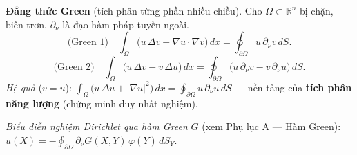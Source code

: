\textbf{Đẳng thức Green} (tích phân từng phần nhiều chiều). Cho $\Omega\subset\mathbb{R}^n$ bị chặn, biên trơn, $\partial_\nu$ là đạo hàm pháp tuyến ngoài.
\[
  \text{(Green 1)}\quad \int_\Omega\big(u\,\Delta v+\nabla u\cdot\nabla v\big)\,dx=\oint_{\partial\Omega} u\,\partial_\nu v\,dS.
\]
\[
  \text{(Green 2)}\quad \int_\Omega\big(u\,\Delta v-v\,\Delta u\big)\,dx=\oint_{\partial\Omega}\big(u\,\partial_\nu v-v\,\partial_\nu u\big)\,dS.
\]
\emph{Hệ quả} ($v=u$): $\displaystyle\int_\Omega\big(u\,\Delta u+|\nabla u|^2\big)\,dx=\oint_{\partial\Omega}u\,\partial_\nu u\,dS$ --- nền tảng của \textbf{tích phân năng lượng} (chứng minh duy nhất nghiệm).

\smallskip
\emph{Biểu diễn nghiệm Dirichlet qua hàm Green} $G$ (xem Phụ lục A --- Hàm Green): $\displaystyle u(X)=-\oint_{\partial\Omega}\partial_\nu G(X,Y)\,\varphi(Y)\,dS_Y$.
